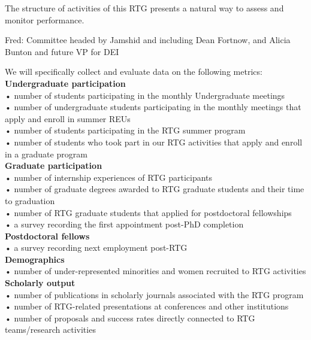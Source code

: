 \documentclass[11pt]{NSFamsart}
\newcommand{\FredNote}[1]{{\color{blue} Fred: #1}}
\begin{document}
The structure  of activities of this RTG presents a natural way to assess and monitor performance.  

\FredNote{Committee headed by Jamshid and including Dean Fortnow, and Alicia Bunton and future VP for DEI }


We will specifically collect and evaluate data on the following metrics:\\

\noindent
\textbf{Undergraduate participation}\\
• number of students participating in the monthly Undergraduate meetings\\
• number of undergraduate students participating in the monthly meetings that apply and enroll in summer REUs\\
• number of students participating in the RTG summer  program\\
• number of students who took part in our RTG activities that apply and enroll in a graduate program\\

\noindent
\textbf{Graduate participation}\\
• number of internship experiences of RTG participants\\
• number of graduate degrees awarded to RTG graduate students and their time to graduation\\
• number of RTG graduate students that applied for postdoctoral fellowships\\
• a survey recording the first appointment post-PhD completion\\

\noindent
\textbf{Postdoctoral fellows}\\
• a survey recording next employment post-RTG     \\

\noindent
\textbf{Demographics}\\
• number of under-represented minorities and women recruited to   RTG activities \\

\noindent
\textbf{Scholarly output}\\
• number of publications in scholarly journals associated with the RTG program\\
• number of RTG-related presentations at conferences and other institutions\\
• number of proposals and success rates directly connected to RTG teams/research activities

 
\end{document}
